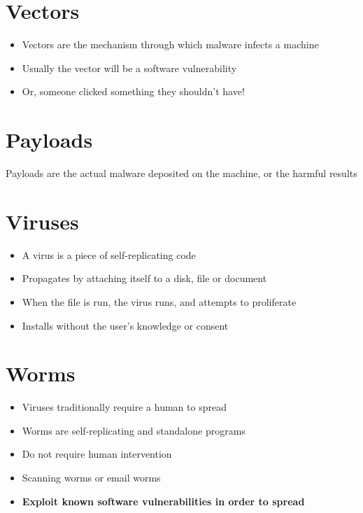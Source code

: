 \documentclass{article}
\begin{document}
\tableofcontents

\newpage

\section{Vectors}
\begin{itemize}
  \item Vectors are the mechanism through which malware infects a machine 
  \item Usually the vector will be a software vulnerability 
  \item Or, someone clicked something they shouldn’t have!
\end{itemize}

\section{Payloads}
\begin{flushleft}
Payloads are the actual malware deposited on the machine, or the harmful results
\end{flushleft}

\section{Viruses}
\begin{itemize}
  \item A virus is a piece of self-replicating code 
  \item Propagates by attaching itself to a disk, file or document 
  \item When the file is run, the virus runs, and attempts to proliferate 
  \item Installs without the user’s knowledge or consent
\end{itemize}

\section{Worms}
\begin{itemize}
  \item Viruses traditionally require a human to spread 
  \item Worms are self-replicating and standalone programs 
  \item Do not require human intervention 
  \item Scanning worms or email worms 
  \item \textbf{Exploit known software vulnerabilities in order to spread}
\end{itemize}
\end{document}
